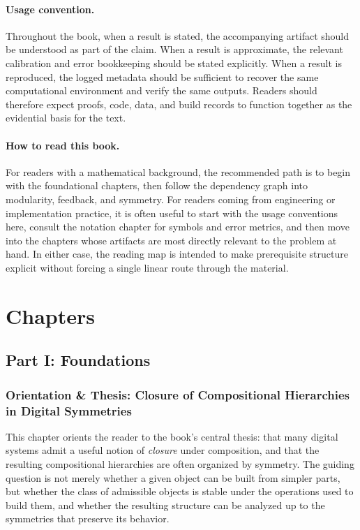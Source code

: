 \documentclass[11pt]{article}
\begin{document}
\paragraph{Usage convention.}
Throughout the book, when a result is stated, the accompanying artifact should be understood as part of the claim. When a result is approximate, the relevant calibration and error bookkeeping should be stated explicitly. When a result is reproduced, the logged metadata should be sufficient to recover the same computational environment and verify the same outputs. Readers should therefore expect proofs, code, data, and build records to function together as the evidential basis for the text.

\paragraph{How to read this book.}
For readers with a mathematical background, the recommended path is to begin with the foundational chapters, then follow the dependency graph into modularity, feedback, and symmetry. For readers coming from engineering or implementation practice, it is often useful to start with the usage conventions here, consult the notation chapter for symbols and error metrics, and then move into the chapters whose artifacts are most directly relevant to the problem at hand. In either case, the reading map is intended to make prerequisite structure explicit without forcing a single linear route through the material.


\section{Chapters}

\subsection{Part I: Foundations}

\subsubsection{Orientation \& Thesis: Closure of Compositional Hierarchies in Digital Symmetries}

This chapter orients the reader to the book's central thesis: that many digital systems admit a useful notion of \emph{closure} under composition, and that the resulting compositional hierarchies are often organized by symmetry. The guiding question is not merely whether a given object can be built from simpler parts, but whether the class of admissible objects is stable under the operations used to build them, and whether the resulting structure can be analyzed up to the symmetries that preserve its behavior.
\end{document}
